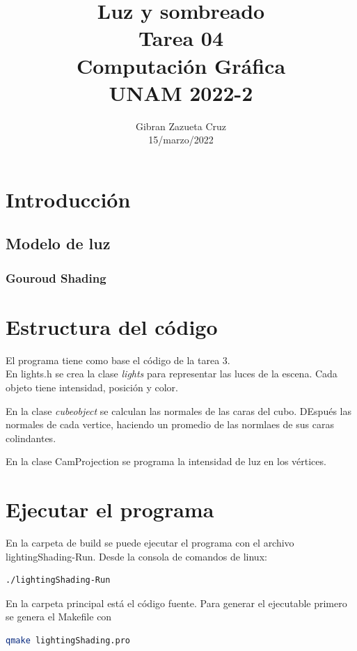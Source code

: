 \documentclass[12pt]{article}
\title{%
  Luz y sombreado\\
  \large Tarea 04 \\
    \Large Computación Gráfica\\
     \large UNAM 2022-2}
\author{Gibran Zazueta Cruz \\
\small 15/marzo/2022}
\date{}
\begin{document}
\maketitle

\section{Introducción}


\subsection{Modelo de luz}

\subsubsection{Gouroud Shading}


\section{Estructura del código}

El programa tiene como base el código de la tarea 3.\\

En lights.h se crea la clase \textit{lights} para representar las luces de la escena. Cada objeto tiene intensidad, posición y color.

En la clase \textit{cubeobject} se calculan las normales de las caras del cubo. DEspués las normales de cada vertice, haciendo un promedio de las normlaes de sus caras colindantes.

En la clase CamProjection se programa la intensidad de luz en los vértices.


\section{Ejecutar el programa}
En la carpeta de build se puede ejecutar el programa con el archivo lightingShading-Run. Desde la consola de comandos de linux:

\begin{lstlisting}[language=bash,title={bash}]
./lightingShading-Run
\end{lstlisting}


En la carpeta principal está el código fuente. Para generar el ejecutable primero se genera el Makefile con

\begin{lstlisting}[language=bash,title={bash}]
 qmake lightingShading.pro
\end{lstlisting}
\end{document}
